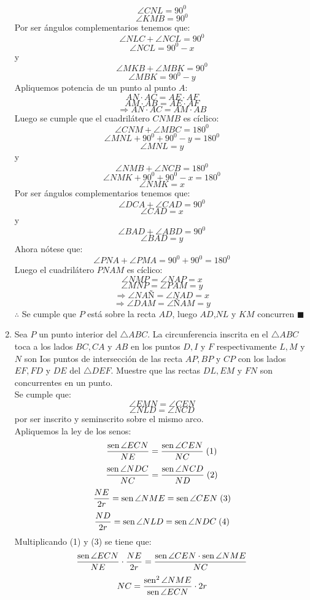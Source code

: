 \documentclass{book}
\newcommand{\sen}{\mathop{\rm sen}\nolimits} %
\begin{document}
\begin{enumerate}
          $$\angle CNL=90^0$$
          $$\angle KMB=90^0$$
          Por ser ángulos complementarios tenemos que:
          $$\angle NLC+\angle NCL=90^0$$
          $$\angle NCL=90^0-x$$
          y
          $$\angle MKB+\angle MBK=90^0$$
          $$\angle MBK=90^0-y$$
          Apliquemos potencia de un punto al punto $A$:
          $$AN\cdot AC=AE\cdot AF$$
          $$AM\cdot AB=AE\cdot AF$$
          $$\Rightarrow AN\cdot AC=AM\cdot AB$$
          Luego se cumple que el cuadrilátero $CNMB$ es cíclico:
          $$\angle CNM+\angle MBC=180^0$$
          $$\angle MNL+90^0+90^0-y=180^0$$
          $$\angle MNL=y$$
          y
          $$\angle NMB+\angle NCB=180^0$$
          $$\angle NMK+90^0+90^0-x=180^0$$
          $$\angle NMK=x$$
          Por ser ángulos complementarios tenemos que:
          $$\angle DCA+\angle CAD=90^0$$
          $$\angle CAD=x$$
          y
          $$\angle BAD+\angle ABD=90^0$$
          $$\angle BAD=y$$
          Ahora nótese que:
          $$\angle PNA+\angle PMA=90^0+90^0=180^0$$
          Luego el cuadrilátero $PNAM$ es cíclico:
          $$\angle NMP=\angle NAP=x$$
          $$\angle MNP=\angle PAM=y$$
          $$\Rightarrow\angle NAÑ=\angle NAD=x$$
          $$\Rightarrow\angle DAM=\angle ÑAM=y$$
          $\therefore$ Se cumple que $P$ está sobre la recta $AD$, luego $AD$,$NL$ y $KM$ concurren $\blacksquare$\\
    \item Sea $P$ un punto interior del $\triangle ABC$. La circunferencia inscrita en el $\triangle ABC$ toca a los lados $BC,CA$ y $AB$ en los puntos $D,I$ y $F$ respectivamente $L,M$ y $N$ son Ios puntos de intersección de las recta $AP,BP$ y $CP$ con los lados $EF,FD$ y $DE$ del $\triangle DEF$. Muestre que las rectas $DL,EM$ y $FN$ son concurrentes en un punto.\\
          Se cumple que:
          $$\angle EMN=\angle CEN$$
          $$\angle NLD=\angle NCD$$
          por ser inscrito y seminscrito sobre el mismo arco.\\
          Apliquemos la ley de los senos:
          $${\sen {\angle ECN}\over NE}={\sen {\angle CEN}\over NC} \; (1)$$
          $${\sen {\angle NDC}\over NC}={\sen {\angle NCD}\over ND} \; (2)$$
          $${NE\over 2r}=\sen {\angle NME}=\sen {\angle CEN}\; (3)$$
          $${ND\over 2r}=\sen {\angle NLD}=\sen {\angle NDC}\; (4)$$
          Multiplicando (1) y (3) se tiene que:
          $${\sen {\angle ECN}\over NE}\cdot{ NE\over 2r}={\sen {\angle CEN}\cdot \sen {\angle NME}\over NC}  $$
          $$NC={\sen^2  {\angle NME}\over\sen {\angle ECN}}\cdot 2r$$

\end{enumerate}
\end{document}
